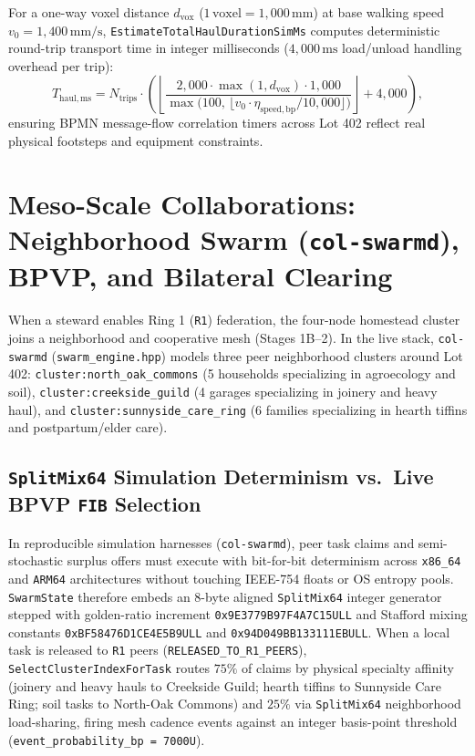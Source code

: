For a one-way voxel distance $d_{\mathrm{vox}}$ ($1\,\mathrm{voxel} = 1{,}000\,\mathrm{mm}$) at
base walking speed $v_0 = 1{,}400\,\mathrm{mm/s}$, \texttt{EstimateTotalHaulDurationSimMs}
computes deterministic round-trip transport time in integer milliseconds ($4{,}000\,\mathrm{ms}$
load/unload handling overhead per trip):
\begin{equation}
\label{eq:haul-duration-ms}
T_{\mathrm{haul,ms}} = N_{\mathrm{trips}} \cdot \left( \left\lfloor \frac{2{,}000 \cdot \max(1, d_{\mathrm{vox}}) \cdot 1{,}000}{\max\bigl(100,\, \lfloor v_0 \cdot \eta_{\mathrm{speed,bp}} / 10{,}000 \rfloor\bigr)} \right\rfloor + 4{,}000 \right),
\end{equation}
ensuring BPMN message-flow correlation timers across Lot 402 reflect real physical footsteps
and equipment constraints.

\section{Meso-Scale Collaborations: Neighborhood Swarm (\texttt{col-swarmd}), BPVP, and Bilateral Clearing}
\label{sec:meso-scale-bpvp-bcc}

When a steward enables Ring 1 (\texttt{R1}) federation, the four-node homestead cluster joins
a neighborhood and cooperative mesh (Stages 1B--2). In the live stack, \texttt{col-swarmd}
(\texttt{swarm\_engine.hpp}) models three peer neighborhood clusters around Lot 402:
\texttt{cluster:north\_oak\_commons} (5 households specializing in agroecology and soil),
\texttt{cluster:creekside\_guild} (4 garages specializing in joinery and heavy haul), and
\texttt{cluster:sunnyside\_care\_ring} (6 families specializing in hearth tiffins and
postpartum/elder care).

\subsection{\texttt{SplitMix64} Simulation Determinism vs.\ Live BPVP \texttt{FIB} Selection}

In reproducible simulation harnesses (\texttt{col-swarmd}), peer task claims and
semi-stochastic surplus offers must execute with bit-for-bit determinism across \texttt{x86\_64}
and \texttt{ARM64} architectures without touching IEEE-754 floats or OS entropy pools.
\texttt{SwarmState} therefore embeds an $8$-byte aligned \texttt{SplitMix64} integer generator
stepped with golden-ratio increment \texttt{0x9E3779B97F4A7C15ULL} and Stafford mixing
constants \texttt{0xBF58476D1CE4E5B9ULL} and \texttt{0x94D049BB133111EBULL}. When a local task
is released to \texttt{R1} peers (\texttt{RELEASED\_TO\_R1\_PEERS}),
\texttt{SelectClusterIndexForTask} routes $75\%$ of claims by physical specialty affinity
(joinery and heavy hauls to Creekside Guild; hearth tiffins to Sunnyside Care Ring; soil tasks
to North-Oak Commons) and $25\%$ via \texttt{SplitMix64} neighborhood load-sharing, firing mesh
cadence events against an integer basis-point threshold (\texttt{event\_probability\_bp = 7000U}).

